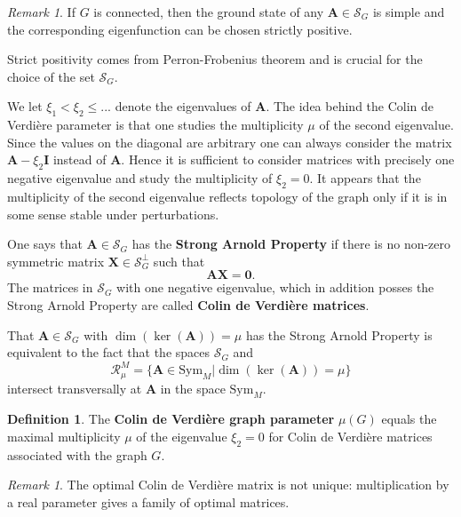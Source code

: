 \documentclass{amsart}
\theoremstyle{definition}
\newtheorem{definition}[theorem]{Definition}
\theoremstyle{remark}
\newtheorem{remark}[theorem]{Remark}
\numberwithin{equation}{section}
\newcommand{\Sc}{\mathcal{S}}
\newcommand{\Rc}{\mathcal{R}}
\newcommand{\sym}{\text{Sym}}
\begin{document}
\begin{remark}
If $ G $ is connected, then the ground state of any  $ \mathbf{A} \in \Sc_G $  is simple and the corresponding
eigenfunction can be chosen strictly positive. 
\end{remark}

Strict positivity comes from Perron-Frobenius theorem and is crucial for the choice of the set $ \Sc_G$.

We let $\xi _1 < \xi _2\leq ...$ denote the eigenvalues of $\mathbf{A}$. The idea behind the Colin de Verdi{\`e}re parameter is that one studies the multiplicity $ \mu $
of the second eigenvalue. Since the values on the diagonal are arbitrary one
 can always consider the matrix $\mathbf{A}-\xi _2\mathbf{I}$ instead of $\mathbf{A}$. Hence it is sufficient to consider matrices with precisely one negative eigenvalue and study the multiplicity of  $\xi _2=0$.
  It appears that the multiplicity of the second eigenvalue reflects topology of the graph only if it is in some sense stable under perturbations.

 One says that $\mathbf{A}\in \Sc_G$ has the {\bf Strong Arnold Property} if there is no non-zero symmetric matrix $\mathbf{X} \in \Sc_G^\perp  $  such that 
 \begin{equation} \label{eqSAP}
 \mathbf{AX}=\mathbf 0.
 \end{equation}
  The
 matrices in $\Sc_G$ with one negative eigenvalue, which in addition posses the Strong Arnold Property are called {\bf Colin de Verdi{\`e}re matrices}.
 


That $\mathbf{A}\in \Sc_G$ with $\dim( \ker(\mathbf{A}))=\mu$ has the Strong Arnold Property is equivalent to the fact that the spaces $\Sc_G$ and  
$$\Rc_\mu^M=\{\mathbf{A}\in \sym_M| \dim( \ker(\mathbf{A}))=\mu\}$$
intersect transversally at $\mathbf{A}$ in the space $\sym_M$. 


\begin{definition}  \label{def1}
The {\bf Colin de Verdi{\`e}re graph parameter} $\mu(G)$ equals the maximal multiplicity $\mu$ of the eigenvalue $\xi _2=0$ for Colin de Verdi{\`e}re matrices
associated with the graph $ G$.
\end{definition}

\begin{remark}
The optimal Colin de Verdi\`ere matrix is not unique: multiplication by a real parameter gives a family of optimal matrices. 
\end{remark}
\end{document}

